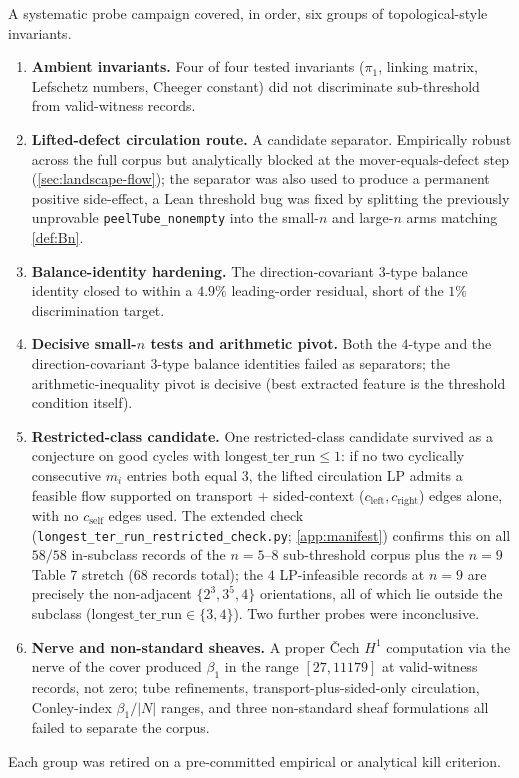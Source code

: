 \documentclass[11pt,a4paper]{article}
\theoremstyle{plain}
\theoremstyle{definition}
\begin{document}
A systematic probe campaign covered, in order, six groups of
topological-style invariants.
\begin{enumerate}[leftmargin=*]
\item \textbf{Ambient invariants.}  Four of four tested invariants
($\pi_1$, linking matrix, Lefschetz numbers, Cheeger constant) did
not discriminate sub-threshold from valid-witness records.
\item \textbf{Lifted-defect circulation route.}  A candidate
separator.  Empirically robust across the full corpus but analytically
blocked at the mover-equals-defect step
(\cref{sec:landscape-flow}); the separator was also used to produce
a permanent positive side-effect, a Lean threshold bug was fixed
by splitting the previously unprovable \texttt{peelTube\_nonempty}
into the small-$n$ and large-$n$ arms matching \cref{def:Bn}.
\item \textbf{Balance-identity hardening.}  The direction-covariant
$3$-type balance identity closed to within a $4.9\%$ leading-order
residual, short of the $1\%$ discrimination target.
\item \textbf{Decisive small-$n$ tests and arithmetic pivot.}
Both the $4$-type and the direction-covariant $3$-type balance
identities failed as separators; the arithmetic-inequality pivot
is decisive (best extracted feature is the threshold condition
itself).
\item \textbf{Restricted-class candidate.}  One restricted-class
candidate survived as a conjecture on good cycles with
$\mathrm{longest\_ter\_run} \le 1$: if no two cyclically consecutive
$m_i$ entries both equal $3$, the lifted circulation LP admits a
feasible flow supported on transport $+$ sided-context
($c_{\mathrm{left}}, c_{\mathrm{right}}$) edges alone, with no
$c_{\mathrm{self}}$ edges used.  The extended check
(\texttt{longest\_ter\_run\_restricted\_check.py}; \cref{app:manifest})
confirms this on all $58/58$ in-subclass records of the $n = 5$--$8$
sub-threshold corpus plus the $n = 9$ Table 7 stretch ($68$ records
total); the $4$ LP-infeasible records at $n = 9$ are precisely the
non-adjacent $\{2^3, 3^5, 4\}$ orientations, all of which lie outside
the subclass ($\mathrm{longest\_ter\_run} \in \{3, 4\}$).  Two further
probes were inconclusive.
\item \textbf{Nerve and non-standard sheaves.}  A proper \v{C}ech
$H^1$ computation via the nerve of the cover produced $\beta_1$ in
the range $[27, 11179]$ at valid-witness records, not zero; tube
refinements, transport-plus-sided-only circulation, Conley-index
$\beta_1 / |N|$ ranges, and three non-standard sheaf formulations
all failed to separate the corpus.
\end{enumerate}
Each group was retired on a pre-committed empirical or analytical
kill criterion.
\end{document}
